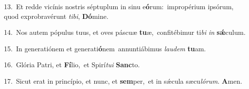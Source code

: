 {\numbfont\textcolor{\numbcolor}{13.}}~Et redde vicínis nostris séptuplum in sinu e\-\textbf{ó}\-rum:~\star impropérium ipsórum, quod exprobravérunt \textit{ti}\-\textit{bi}, \textbf{Dó}\-mine.\par
{\numbfont\textcolor{\numbcolor}{14.}}~Nos autem pópulus tuus, et oves páscuæ \textbf{tu}\-æ,~\star confitébimur ti\textit{bi} \textit{in} \textbf{sǽ}\-culum.\par
{\numbfont\textcolor{\numbcolor}{15.}}~In generatiónem et generati\-\textbf{ó}\-nem~\star annuntiábimus \textit{lau}\-\textit{dem} \textbf{tu}\-am.\par
{\numbfont\textcolor{\numbcolor}{16.}}~Glória Patri, et \textbf{Fí}\-lio,~\star et Spirí\-\textit{tu}\-\textit{i} \textbf{Sanc}\-to.\par
{\numbfont\textcolor{\numbcolor}{17.}}~Sicut erat in princípio, et nunc, et \textbf{sem}\-per,~\star et in sǽcula sæcu\-\textit{ló}\-\textit{rum}. \textbf{A}\-men.\par
